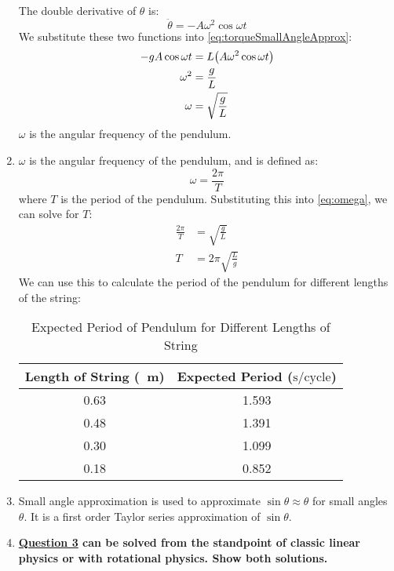 \documentclass[article, 12pt]{article}
\DeclarePairedDelimiter\paren{(}{)} %
\begin{document}
\begin{enumerate}[1)]
    The double derivative of $\theta$ is:
    \begin{equation}
        \ddot{\theta} = -A\omega^2\cos{\omega t}
        \label{eq:ddotTheta}
    \end{equation}
    We substitute these two functions into \autoref{eq:torqueSmallAngleApprox}:
    \begin{align}
        -gA\cos{\omega t} &= L\paren*{A\omega^2\cos{\omega t}} \nonumber \\
        \omega^2 &= \frac{g}{L} \nonumber \\
        \omega &= \sqrt{\frac{g}{L}}
        \label{eq:omega}
    \end{align}
    $\omega$ is the angular frequency of the pendulum.
    \item     
    $\omega$ is the angular frequency of the pendulum, and is defined as:
    \begin{equation}
        \omega = \frac{2\pi}{T}
    \end{equation}
    where $T$ is the period of the pendulum. Substituting this into \autoref{eq:omega}, we can solve for $T$:
    \begin{align}
        \frac{2\pi}{T} &= \sqrt{\frac{g}{L}} \nonumber \\
        T &= 2\pi \sqrt{\frac{L}{g}}
        \label{eq:period}
    \end{align}
    We can use this to calculate the period of the pendulum for different lengths of the string:
    \begin{table}[H]
        \centering
        \begin{tabular}{|c|c|}
            \hline
            \textbf{Length of String} (\SI{}{\meter}) & \textbf{Expected Period} ($\text{s}/\text{cycle}$) \\
            \hline
            0.63 & 1.593 \\
            0.48 & 1.391 \\
            0.30 & 1.099 \\
            0.18 & 0.852 \\
            \hline
        \end{tabular}
        \caption{Expected Period of Pendulum for Different Lengths of String}
        \label{tab:expectedPeriod}
    \end{table}
    \item Small angle approximation is used to approximate $\sin{\theta} \approx \theta$ for small angles $\theta$. It is a first order Taylor series approximation of $\sin{\theta}$.
    \item \textbf{\hyperref[q:diffRotation]{Question 3} can be solved from the standpoint of classic linear physics or with rotational physics.  Show both solutions.}
    

\end{enumerate}
\end{document}
